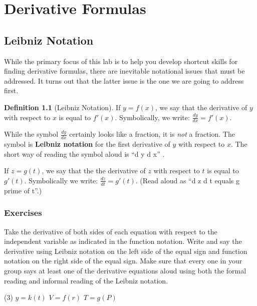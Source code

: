 \documentclass[12pt,]{book}
\newcommand{\terminology}[1]{\textbf{#1}}
\theoremstyle{plain}
\theoremstyle{definition}
\newtheorem{definition}[theorem]{Definition}
\numberwithin{equation}{section}
\newcommand{\fe}[2]{#1\mathopen{}\left(#2\right)\mathclose{}}
\newcommand{\fd}[1]{#1'}
\newcommand{\lz}[2]{\frac{d#1}{d#2}}
\begin{document}
\chapter[Derivative Formulas]{Derivative Formulas}\label{chapter-derivative-formulas}
\typeout{************************************************}
\typeout{************************************************}
\section[Leibniz Notation]{Leibniz Notation}\label{section-leibniz-notation}
While the primary focus of this lab is to help you develop shortcut skills for finding derivative formulas, there are inevitable notational issues that must be addressed.  It turns out that the latter issue is the one we are going to address first.%
\begin{definition}[Leibniz Notation]\label{definition-9}
If \(y=\fe{f}{x}\), we say that the derivative of \(y\) with respect to \(x\) is equal to \(\fe{\fd{f}}{x}\). Symbolically, we write: \(\lz{y}{x}=\fe{\fd{f}}{x}\).%
\par
While the symbol \(\lz{y}{x}\) certainly looks like a fraction, it is \emph{not} a fraction.  The symbol is \terminology{Leibniz notation} for the first derivative of \(y\) with respect to \(x\).  The short way of reading the symbol aloud is ``d y d x''%
.

            \par
If \(z=\fe{g}{t}\), we say that the the derivative of \(z\) with respect to \(t\) is equal to \(\fe{\fd{g}}{t}\).  Symbolically we write: \(\lz{z}{t}=\fe{\fd{g}}{t}\). (Read aloud as ``d z d t equals g prime of t''.)%
\end{definition}
\typeout{************************************************}
\typeout{************************************************}
\subsection[Exercises]{Exercises}\label{exercises-31}
Take the derivative of both sides of each equation with respect to the independent variable as indicated in the function notation.  Write and say the derivative using Leibniz notation on the left side of the equal sign and function notation on the right side of the equal sign.  Make sure that every one in your group says at least one of the derivative equations aloud using both the formal reading and informal reading of the Leibniz notation.%
\par
\begin{exercisegroup}(3)
\exercise[1.]\hypertarget{exercise-345}{\null}\(y=\fe{k}{t}\)%
\exercise[2.]\hypertarget{exercise-346}{\null}\(V=\fe{f}{r}\)%
\exercise[3.]\hypertarget{exercise-347}{\null}\(T=\fe{g}{P}\)%
\end{exercisegroup}
\par\smallskip\noindent
\typeout{************************************************}
\typeout{************************************************}
\end{document}
